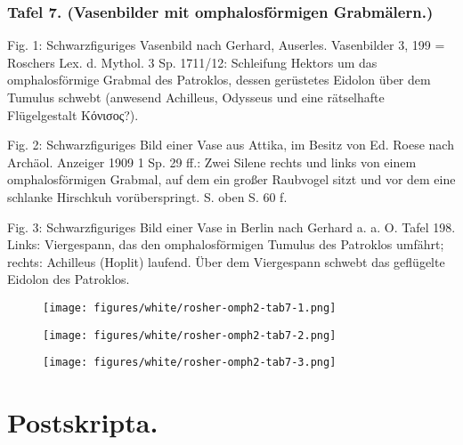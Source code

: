 \documentclass[a4paper, 11pt, oneside]{article}
\begin{document}
\subsubsection{Tafel 7. (Vasenbilder mit omphalosförmigen Grabmälern.)}

Fig. 1: Schwarzfiguriges Vasenbild nach Gerhard, Auserles. Vasenbilder 3, 199 = Roschers Lex. d. Mythol. 3 Sp. 1711/12: Schleifung Hektors um das omphalosförmige Grabmal des Patroklos, dessen gerüstetes Eidolon über dem Tumulus schwebt (anwesend Achilleus, Odysseus und eine rätselhafte Flügelgestalt Κόνισος?).

Fig. 2: Schwarzfiguriges Bild einer Vase aus Attika, im Besitz von Ed. Roese nach Archäol. Anzeiger 1909 1 Sp. 29 ff.: Zwei Silene rechts und links von einem omphalosförmigen Grabmal, auf dem ein großer Raubvogel sitzt und vor dem eine schlanke Hirschkuh vorüberspringt. S. oben S. 60 f.

Fig. 3: Schwarzfiguriges Bild einer Vase in Berlin nach Gerhard a. a. O. Tafel 198. Links: Viergespann, das den omphalosförmigen Tumulus des Patroklos umfährt; rechts: Achilleus (Hoplit) laufend. Über dem Viergespann schwebt das geflügelte Eidolon des Patroklos.
\clearpage
\begin{landscape}
\vspace*{\fill}
\begin{figure}[H]
\centering
\texttt{[image: figures/white/rosher-omph2-tab7-1.png]}
\caption{}
\end{figure}
\vspace*{\fill}
\clearpage
\vspace*{\fill}
\begin{figure}[H]
\centering
\texttt{[image: figures/white/rosher-omph2-tab7-2.png]}
\caption{}
\end{figure}
\vspace*{\fill}
\clearpage
\vspace*{\fill}
\begin{figure}[H]
\centering
\texttt{[image: figures/white/rosher-omph2-tab7-3.png]}
\caption{}
\end{figure}
\vspace*{\fill}
\clearpage
\end{landscape}
\section{Postskripta.}
\end{document}
